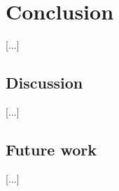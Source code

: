 \section{Conclusion}
\label{conclusion}

[...]

\subsection{Discussion}

[...]

\subsection{Future work}

[...]

